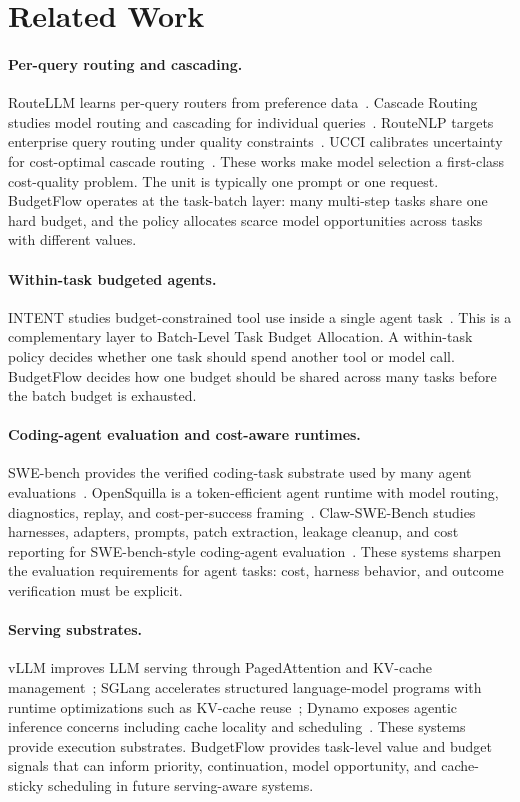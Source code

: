 \documentclass{article}
\begin{document}
\section{Related Work}
\label{sec:related}
\paragraph{Per-query routing and cascading.}
RouteLLM learns per-query routers from preference data~\cite{routellm}. Cascade Routing studies model routing and cascading for individual queries~\cite{cascade-routing}. RouteNLP targets enterprise query routing under quality constraints~\cite{routenlp}. UCCI calibrates uncertainty for cost-optimal cascade routing~\cite{ucci}. These works make model selection a first-class cost-quality problem. The unit is typically one prompt or one request. BudgetFlow operates at the task-batch layer: many multi-step tasks share one hard budget, and the policy allocates scarce model opportunities across tasks with different values.

\paragraph{Within-task budgeted agents.}
INTENT studies budget-constrained tool use inside a single agent task~\cite{intent}. This is a complementary layer to Batch-Level Task Budget Allocation. A within-task policy decides whether one task should spend another tool or model call. BudgetFlow decides how one budget should be shared across many tasks before the batch budget is exhausted.

\paragraph{Coding-agent evaluation and cost-aware runtimes.}
SWE-bench provides the verified coding-task substrate used by many agent evaluations~\cite{swebench}. OpenSquilla is a token-efficient agent runtime with model routing, diagnostics, replay, and cost-per-success framing~\cite{opensquilla}. Claw-SWE-Bench studies harnesses, adapters, prompts, patch extraction, leakage cleanup, and cost reporting for SWE-bench-style coding-agent evaluation~\cite{claw-swe-bench}. These systems sharpen the evaluation requirements for agent tasks: cost, harness behavior, and outcome verification must be explicit.

\paragraph{Serving substrates.}
vLLM improves LLM serving through PagedAttention and KV-cache management~\cite{vllm}; SGLang accelerates structured language-model programs with runtime optimizations such as KV-cache reuse~\cite{sglang}; Dynamo exposes agentic inference concerns including cache locality and scheduling~\cite{dynamo}. These systems provide execution substrates. BudgetFlow provides task-level value and budget signals that can inform priority, continuation, model opportunity, and cache-sticky scheduling in future serving-aware systems.
\end{document}

